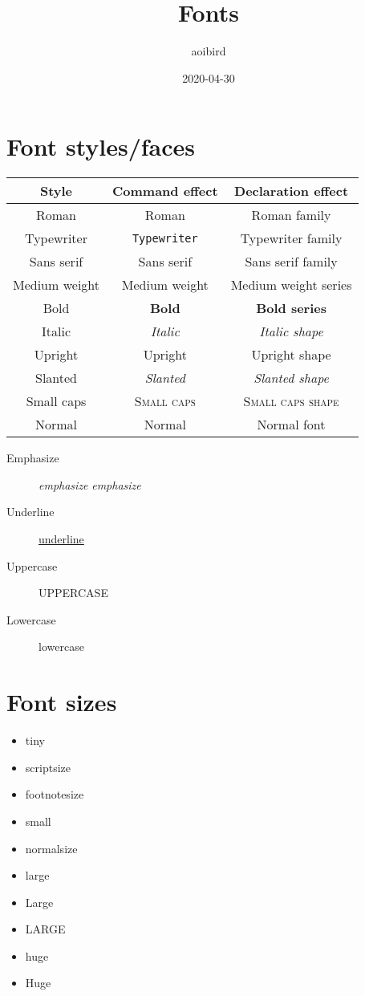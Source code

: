 \documentclass{article}
\title{Fonts}
\author{aoibird}
\date{2020-04-30}
\begin{document}
\maketitle

\section{Font styles/faces}

\begin{tabular}{c|c|c}
  \hline
  Style & Command effect & Declaration effect\\
  \hline
  Roman & \textrm{Roman} & {\rmfamily Roman family} \\
  Typewriter & \texttt{Typewriter} & {\ttfamily Typewriter family}\\
  Sans serif & \textsf{Sans serif} & {\sffamily Sans serif family}\\
  Medium weight & \textmd{Medium weight} & {\mdseries Medium weight series}\\
  Bold & \textbf{Bold} & {\bfseries Bold series}\\
  Italic & \textit{Italic} & {\itshape Italic shape}\\
  Upright & \textup{Upright} & {\upshape Upright shape}\\
  Slanted & \textsl{Slanted} & {\slshape Slanted shape}\\
  Small caps & \textsc{Small caps} & {\scshape Small caps shape}\\
  Normal & \textnormal{Normal} & {\normalfont Normal font}\\
  \hline
\end{tabular}

\begin{description}
\item[Emphasize] \emph{emphasize} {\em emphasize}
\item[Underline] \underline{underline}
\item[Uppercase] \uppercase{uppercase}
\item[Lowercase] \lowercase{LOWERCASE}
\end{description}

\section{Font sizes}

\begin{itemize}
\item {\tiny tiny}
\item {\scriptsize scriptsize}
\item {\footnotesize footnotesize}
\item {\small small}
\item {\normalsize normalsize}
\item {\large large}
\item {\Large Large}
\item {\LARGE LARGE}
\item {\huge huge}
\item {\Huge Huge}
\end{itemize}
\end{document}
